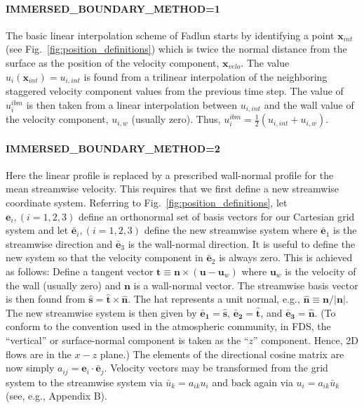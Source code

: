 \documentclass[12pt]{article}
\begin{document}
\paragraph{\ct IMMERSED\_BOUNDARY\_METHOD=1}

The basic linear interpolation scheme of Fadlun starts by identifying a point $\mathbf{x}_{int}$ (see Fig.~\ref{fig:position_definitions}) which is twice the normal distance from the surface as the position of the velocity component, $\mathbf{x}_{velo}$.  The value $u_i(\mathbf{x}_{int}) = u_{i,int}$ is found from a trilinear interpolation of the neighboring staggered velocity component values from the previous time step.  The value of $u_i^{ibm}$ is then taken from a linear interpolation between $u_{i,int}$ and the wall value of the velocity component, $u_{i,w}$ (usually zero).  Thus, $u_i^{ibm} = \frac{1}{2}(u_{i,int} + u_{i,w})$.

\paragraph{\ct IMMERSED\_BOUNDARY\_METHOD=2}

Here the linear profile is replaced by a prescribed wall-normal profile for the mean streamwise velocity.  This requires that we first define a new streamwise coordinate system.  Referring to Fig.~\ref{fig:position_definitions}, let $\mathbf{e}_i, (i=1,2,3)$ define an orthonormal set of basis vectors for our Cartesian grid system and let $\mathbf{\bar{e}}_i, (i=1,2,3)$ define the new streamwise system where $\mathbf{\bar{e}}_1$ is the streamwise direction and $\mathbf{\bar{e}}_3$ is the wall-normal direction.  It is useful to define the new system so that the velocity component in $\mathbf{\bar{e}}_2$ is always zero.  This is achieved as follows: Define a tangent vector $\mathbf{t} \equiv \mathbf{n} \times (\mathbf{u} - \mathbf{u}_w)$ where $\mathbf{u}_w$ is the velocity of the wall (usually zero) and $\mathbf{n}$ is a wall-normal vector. The streamwise basis vector is then found from $\mathbf{\hat{s}} = \mathbf{\hat{t}} \times \mathbf{\hat{n}}$.  The hat represents a unit normal, e.g., $\mathbf{\hat{n}} \equiv \mathbf{n}/|\mathbf{n}|$.  The new streamwise system is then given by $\mathbf{\bar{e}_1}=\mathbf{\hat{s}}$, $\mathbf{\bar{e}_2}=\mathbf{\hat{t}}$, and $\mathbf{\bar{e}_3}=\mathbf{\hat{n}}$. (To conform to the convention used in the atmospheric community, in FDS, the ``vertical'' or surface-normal component is taken as the ``$z$'' component.  Hence, 2D flows are in the $x-z$ plane.)  The elements of the directional cosine matrix are now simply $a_{ij} = \mathbf{e}_i \cdot \mathbf{\bar{e}}_j$.  Velocity vectors may be transformed from the grid system to the streamwise system via $\bar{u}_k = a_{ik} u_i$ and back again via $u_i = a_{ik} \bar{u}_k$ (see, e.g., \cite{Pope:2000} Appendix B).
\end{document}

